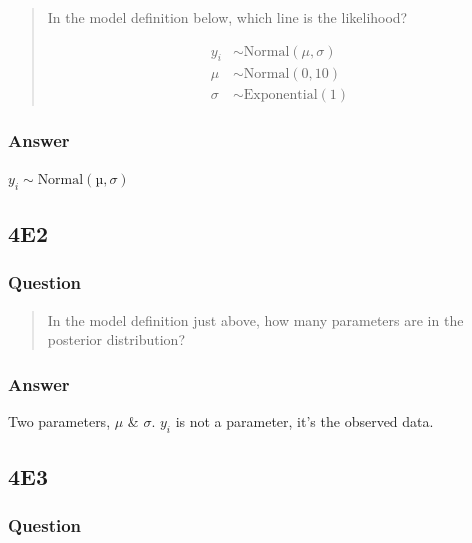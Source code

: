 \documentclass[
]{book}
\begin{document}
\begin{quote}
In the model definition below, which line is the likelihood?

\[
\begin{aligned}
y_i &\sim \text{Normal}(\mu, \sigma) \\
\mu &\sim \text{Normal}(0, 10) \\
\sigma &\sim \text{Exponential}(1)
\end{aligned}
\]
\end{quote}

\hypertarget{answer-33}{%
\subsubsection*{Answer}\label{answer-33}}

\(y_i ∼ \text{Normal}(µ, σ)\)

\hypertarget{e2-2}{%
\subsection*{4E2}\label{e2-2}}

\hypertarget{question-34}{%
\subsubsection*{Question}\label{question-34}}

\begin{quote}
In the model definition just above, how many parameters are in the posterior distribution?
\end{quote}

\hypertarget{answer-34}{%
\subsubsection*{Answer}\label{answer-34}}

Two parameters, \(\mu\) \& \(\sigma\). \(y_i\) is not a parameter, it's the observed data.

\hypertarget{e3-2}{%
\subsection*{4E3}\label{e3-2}}

\hypertarget{question-35}{%
\subsubsection*{Question}\label{question-35}}
\end{document}
